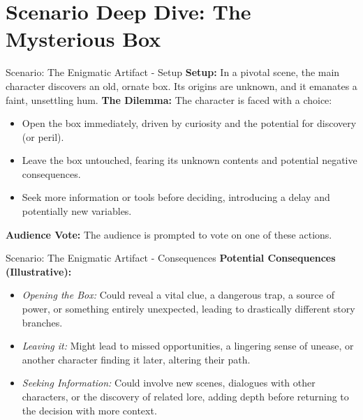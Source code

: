 \documentclass[aspectratio=169]{beamer}
\begin{document}
\section{Scenario Deep Dive: The Mysterious Box}
\begin{frame}{Scenario: The Enigmatic Artifact - Setup}
    \textbf{Setup:} In a pivotal scene, the main character discovers an old, ornate box. Its origins are unknown, and it emanates a faint, unsettling hum.
    \newline\newline
    \textbf{The Dilemma:} The character is faced with a choice:
    \begin{itemize}
        \item Open the box immediately, driven by curiosity and the potential for discovery (or peril).
        \item Leave the box untouched, fearing its unknown contents and potential negative consequences.
        \item Seek more information or tools before deciding, introducing a delay and potentially new variables.
    \end{itemize}
    \textbf{Audience Vote:} The audience is prompted to vote on one of these actions.
\end{frame}

\begin{frame}{Scenario: The Enigmatic Artifact - Consequences}
    \textbf{Potential Consequences (Illustrative):}
    \begin{itemize}
        \item \textit{Opening the Box:} Could reveal a vital clue, a dangerous trap, a source of power, or something entirely unexpected, leading to drastically different story branches.
        \item \textit{Leaving it:} Might lead to missed opportunities, a lingering sense of unease, or another character finding it later, altering their path.
        \item \textit{Seeking Information:} Could involve new scenes, dialogues with other characters, or the discovery of related lore, adding depth before returning to the decision with more context.
    \end{itemize}
\end{frame}
\end{document}
